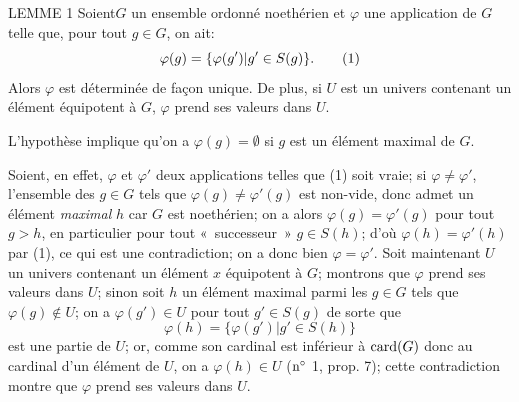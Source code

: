 \documentclass[10pt]{../fichiers-configuration-latex/smfart}
\begin{document}
\begin{enonce*}{LEMME 1}
Soient\pageoriginale $G$ un ensemble ordonné noethérien et $\varphi$
une application de $G$ telle que, pour tout $g\in G$, on ait:
\begin{equation}
\varphi(g)=\{\varphi(g')| g'\in S(g)\}{}.\tag{1}
\end{equation}
Alors $\varphi$ est déterminée de façon unique. De plus, si $U$ est
un univers contenant un élément équipotent à $G$, $\varphi$ prend
ses valeurs dans $U$.
\end{enonce*}

L'hypothèse implique qu'on a $\varphi(g)=∅$ si $g$ est un
élément maximal de $G$.

Soient, en effet, $\varphi$ et $\varphi'$ deux applications telles
que (1) soit vraie; si $\varphi\neq \varphi'$, l'ensemble des $g\in
G$ tels que $\varphi(g)\neq \varphi'(g)$ est non-vide, donc admet un
élément \emph{maximal} $h$ car $G$ est noethérien; on a alors
$\varphi(g)=\varphi'(g)$ pour tout $g>h$, en particulier pour tout
« successeur » $g\in S(h)$; d'où $\varphi(h)=\varphi'(h)$ par
(1), ce qui est une contradiction; on a donc bien
$\varphi=\varphi'$. Soit maintenant $U$ un univers contenant un
élément $x$ équipotent à $G$; montrons que $\varphi$ prend ses
valeurs dans $U$; sinon soit $h$ un élément maximal parmi les $g\in
G$ tels que $\varphi(g)\not\in U$; on a $\varphi(g')\in U$ pour tout
$g'\in S(g)$ de sorte que
$$
\varphi(h)=\{\varphi(g')| g'\in S(h)\}
$$
est une partie de $U$; or, comme son cardinal est inférieur à
$\operatorname{card}(G)$ donc au cardinal d'un élément de $U$, on a $\varphi(h)\in
U$ (${\rm n^{\circ}}$ 1, prop. 7); cette contradiction montre que
$\varphi$ prend ses valeurs dans $U$.
\end{document}
